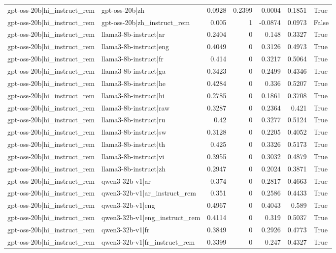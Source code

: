\begin{table}
\begin{tabular}{l l r r r r l}
gpt-oss-20b|hi_instruct_rem & gpt-oss-20b|zh & 0.0928 & 0.2399 & 0.0004 & 0.1851 & True \\
gpt-oss-20b|hi_instruct_rem & gpt-oss-20b|zh_instruct_rem & 0.005 & 1 & -0.0874 & 0.0973 & False \\
gpt-oss-20b|hi_instruct_rem & llama3-8b-instruct|ar & 0.2404 & 0 & 0.148 & 0.3327 & True \\
gpt-oss-20b|hi_instruct_rem & llama3-8b-instruct|eng & 0.4049 & 0 & 0.3126 & 0.4973 & True \\
gpt-oss-20b|hi_instruct_rem & llama3-8b-instruct|fr & 0.414 & 0 & 0.3217 & 0.5064 & True \\
gpt-oss-20b|hi_instruct_rem & llama3-8b-instruct|ga & 0.3423 & 0 & 0.2499 & 0.4346 & True \\
gpt-oss-20b|hi_instruct_rem & llama3-8b-instruct|he & 0.4284 & 0 & 0.336 & 0.5207 & True \\
gpt-oss-20b|hi_instruct_rem & llama3-8b-instruct|hi & 0.2785 & 0 & 0.1861 & 0.3708 & True \\
gpt-oss-20b|hi_instruct_rem & llama3-8b-instruct|raw & 0.3287 & 0 & 0.2364 & 0.421 & True \\
gpt-oss-20b|hi_instruct_rem & llama3-8b-instruct|ru & 0.42 & 0 & 0.3277 & 0.5124 & True \\
gpt-oss-20b|hi_instruct_rem & llama3-8b-instruct|sw & 0.3128 & 0 & 0.2205 & 0.4052 & True \\
gpt-oss-20b|hi_instruct_rem & llama3-8b-instruct|th & 0.425 & 0 & 0.3326 & 0.5173 & True \\
gpt-oss-20b|hi_instruct_rem & llama3-8b-instruct|vi & 0.3955 & 0 & 0.3032 & 0.4879 & True \\
gpt-oss-20b|hi_instruct_rem & llama3-8b-instruct|zh & 0.2947 & 0 & 0.2024 & 0.3871 & True \\
gpt-oss-20b|hi_instruct_rem & qwen3-32b-v1|ar & 0.374 & 0 & 0.2817 & 0.4663 & True \\
gpt-oss-20b|hi_instruct_rem & qwen3-32b-v1|ar_instruct_rem & 0.351 & 0 & 0.2586 & 0.4433 & True \\
gpt-oss-20b|hi_instruct_rem & qwen3-32b-v1|eng & 0.4967 & 0 & 0.4043 & 0.589 & True \\
gpt-oss-20b|hi_instruct_rem & qwen3-32b-v1|eng_instruct_rem & 0.4114 & 0 & 0.319 & 0.5037 & True \\
gpt-oss-20b|hi_instruct_rem & qwen3-32b-v1|fr & 0.3849 & 0 & 0.2926 & 0.4773 & True \\
gpt-oss-20b|hi_instruct_rem & qwen3-32b-v1|fr_instruct_rem & 0.3399 & 0 & 0.247 & 0.4327 & True \\

\end{tabular}
\end{table}

